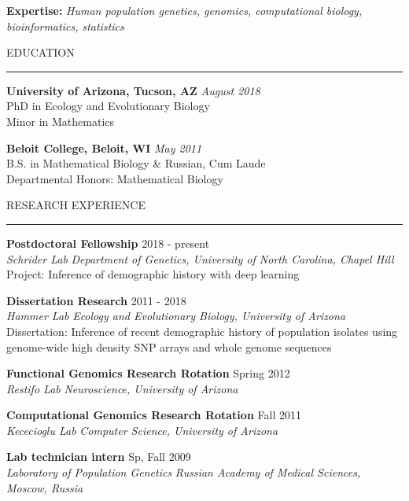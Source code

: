 \documentclass{resume} %
\renewenvironment{rSection}[1]{
\sectionskip
\textcolor{RoyalPurple}{\MakeUppercase{#1}}
\sectionlineskip
\hrule
\begin{list}{}{
\setlength{\leftmargin}{1.5em}
}
\item[]
}{
\end{list}
}
\begin{document}

\textcolor{RoyalPurple}{\bf Expertise:}
\textcolor{RoyalPurple}{\em Human population genetics, genomics, computational biology, bioinformatics, statistics}

\begin{rSection}{Education}

{\bf University of Arizona, Tucson, AZ} \hfill {\em August 2018} \\ 
PhD in Ecology and Evolutionary Biology \\
Minor in Mathematics 

{\bf Beloit College, Beloit, WI} \hfill {\em May 2011} \\ 
B.S. in Mathematical Biology \& Russian, Cum Laude \smallskip \\
Departmental Honors: Mathematical Biology

\end{rSection}


\begin{rSection}{Research Experience}

{\bf Postdoctoral Fellowship} \hfill  2018 - present\\ 
{\em Schrider Lab} \hfill {\em Department of Genetics, University of North Carolina, Chapel Hill}\\
Project: Inference of demographic history with deep learning

{\bf Dissertation Research} \hfill  2011 - 2018\\ 
{\em Hammer Lab} \hfill {\em Ecology and Evolutionary Biology, University of Arizona}\\
Dissertation: Inference of recent demographic history of population isolates using genome-wide high density SNP arrays and whole genome sequences

{\bf Functional Genomics Research Rotation} \hfill  Spring 2012\\ 
{\em Restifo Lab} \hfill {\em Neuroscience, University of Arizona}

{\bf Computational Genomics Research Rotation} \hfill  Fall 2011\\ 
{\em Kececioglu Lab} \hfill {\em Computer Science, University of Arizona}

{\bf Lab technician intern} \hfill  Sp, Fall 2009\\ 
{\em Laboratory of Population Genetics} \hfill {\em Russian Academy of Medical Sciences, Moscow, Russia}

\end{rSection}
\end{document}
